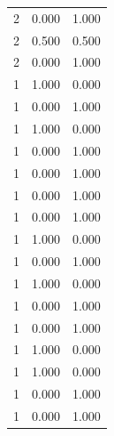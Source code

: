\begin{tabular}{rrr}
2 & 0.000 & 1.000 \\
2 & 0.500 & 0.500 \\
2 & 0.000 & 1.000 \\
1 & 1.000 & 0.000 \\
1 & 0.000 & 1.000 \\
1 & 1.000 & 0.000 \\
1 & 0.000 & 1.000 \\
1 & 0.000 & 1.000 \\
1 & 0.000 & 1.000 \\
1 & 0.000 & 1.000 \\
1 & 1.000 & 0.000 \\
1 & 0.000 & 1.000 \\
1 & 1.000 & 0.000 \\
1 & 0.000 & 1.000 \\
1 & 0.000 & 1.000 \\
1 & 1.000 & 0.000 \\
1 & 1.000 & 0.000 \\
1 & 0.000 & 1.000 \\
1 & 0.000 & 1.000 \\
\bottomrule
\end{tabular}
